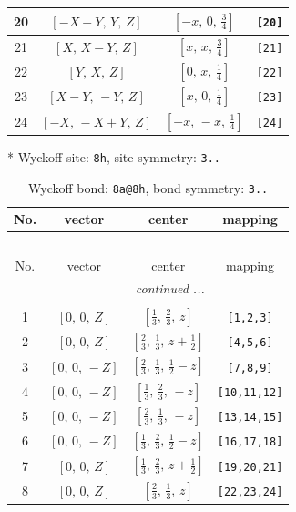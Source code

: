 \documentclass[fleqn,8pt]{jsarticle}
\begin{document}
\begin{longtable}{cccc}
20 & $\left[ - X + Y,\, Y,\, Z \right]$ & $\left[ - x,\, 0,\, \frac{3}{4} \right]$ & {\tt [20]} \\ \hline
21 & $\left[ X,\, X - Y,\, Z \right]$ & $\left[ x,\, x,\, \frac{3}{4} \right]$ & {\tt [21]} \\ \hline
22 & $\left[ Y,\, X,\, Z \right]$ & $\left[ 0,\, x,\, \frac{1}{4} \right]$ & {\tt [22]} \\ \hline
23 & $\left[ X - Y,\, - Y,\, Z \right]$ & $\left[ x,\, 0,\, \frac{1}{4} \right]$ & {\tt [23]} \\ \hline
24 & $\left[ - X,\, - X + Y,\, Z \right]$ & $\left[ - x,\, - x,\, \frac{1}{4} \right]$ & {\tt [24]} \\
\end{longtable}
* Wyckoff site: {\tt 8h}, site symmetry: {\tt 3..}
\renewcommand{\arraystretch}{1.2}
\begin{longtable}{cccc}
\caption{Wyckoff bond: {\tt 8a@8h}, bond symmetry: {\tt 3..}}
 \\
 \hline \hline
No. & vector & center & mapping \\ \hline \endfirsthead

\multicolumn{3}{l}{\tablename\ \thetable{}} \\
 \hline \hline
No. & vector & center & mapping \\ \hline \endhead

 \hline \hline
\multicolumn{3}{r}{\footnotesize\it continued ...} \\ \endfoot

 \hline \hline
\multicolumn{3}{r}{} \\ \endlastfoot

1 & $\left[ 0,\, 0,\, Z \right]$ & $\left[ \frac{1}{3},\, \frac{2}{3},\, z \right]$ & {\tt [1,2,3]} \\ \hline
2 & $\left[ 0,\, 0,\, Z \right]$ & $\left[ \frac{2}{3},\, \frac{1}{3},\, z + \frac{1}{2} \right]$ & {\tt [4,5,6]} \\ \hline
3 & $\left[ 0,\, 0,\, - Z \right]$ & $\left[ \frac{2}{3},\, \frac{1}{3},\, \frac{1}{2} - z \right]$ & {\tt [7,8,9]} \\ \hline
4 & $\left[ 0,\, 0,\, - Z \right]$ & $\left[ \frac{1}{3},\, \frac{2}{3},\, - z \right]$ & {\tt [10,11,12]} \\ \hline
5 & $\left[ 0,\, 0,\, - Z \right]$ & $\left[ \frac{2}{3},\, \frac{1}{3},\, - z \right]$ & {\tt [13,14,15]} \\ \hline
6 & $\left[ 0,\, 0,\, - Z \right]$ & $\left[ \frac{1}{3},\, \frac{2}{3},\, \frac{1}{2} - z \right]$ & {\tt [16,17,18]} \\ \hline
7 & $\left[ 0,\, 0,\, Z \right]$ & $\left[ \frac{1}{3},\, \frac{2}{3},\, z + \frac{1}{2} \right]$ & {\tt [19,20,21]} \\ \hline
8 & $\left[ 0,\, 0,\, Z \right]$ & $\left[ \frac{2}{3},\, \frac{1}{3},\, z \right]$ & {\tt [22,23,24]} \\
\end{longtable}
\end{document}

